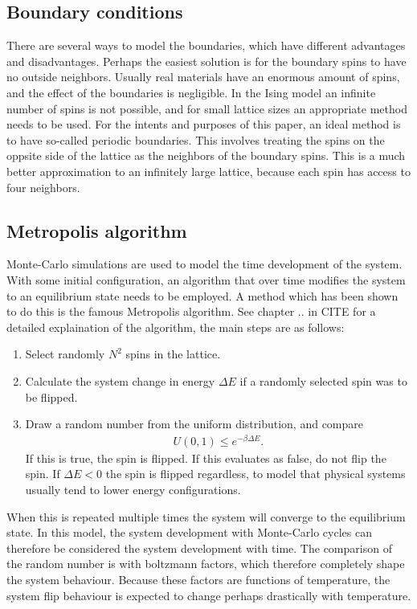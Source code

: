 \documentclass[aps,reprint]{revtex4-1}
\begin{document}
\subsection{Boundary conditions}
There are several ways to model the boundaries, which have different advantages
and disadvantages. Perhaps the easiest solution is for the boundary spins to have
no outside neighbors. Usually real materials have an enormous amount of spins,
and the effect of the boundaries is negligible. In the Ising model an infinite
number of spins is not possible, and for small lattice sizes an appropriate
method needs to be used. For the intents and purposes of this paper, an ideal
method is to have so-called periodic boundaries. This involves treating the
spins on the oppsite side of the lattice as the neighbors of the boundary spins.
This is a much better approximation to an infinitely large lattice, because
each spin has access to four neighbors.

\subsection{Metropolis algorithm} \label{sec:theory_metro}
Monte-Carlo simulations are used to model the time development of the system.
With some initial configuration, an algorithm that over time modifies the system
to an equilibrium state needs to be employed. A method which has been shown to
do this is the famous Metropolis algorithm. See chapter .. in CITE for a detailed explaination
of the algorithm, the main steps are as follows:
\begin{enumerate}
  \item Select randomly $N^2$ spins in the lattice.
  \item Calculate the system change in energy $\Delta E$ if a randomly selected spin was to
  be flipped.
  \item Draw a random number from the uniform distribution, and compare
  \begin{align*}
    U(0,1) \leq e^{-\beta \Delta E}.
  \end{align*}
  If this is true, the spin is flipped. If this evaluates as false, do not flip
  the spin. If $\Delta E < 0$ the spin is flipped regardless, to model that physical
  systems usually tend to lower energy configurations.
\end{enumerate}
When this is repeated multiple times the system will converge to the equilibrium
state. In this model, the system development with Monte-Carlo cycles can therefore be
considered the system development with time. The comparison of the random number
is with boltzmann factors, which therefore completely shape the system behaviour.
Because these factors are functions of temperature, the system flip behaviour is
expected to change perhaps drastically with temperature.
\end{document}
